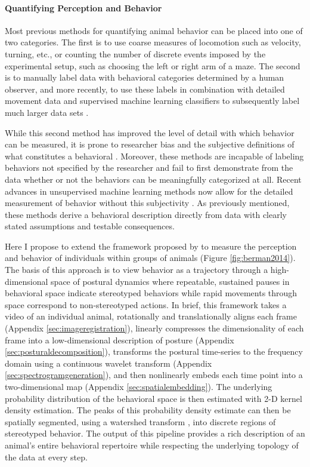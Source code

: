 \documentclass[11pt,a4paper,oneside]{article}
\begin{document}
	\paragraph{Quantifying Perception and Behavior}
	\par
	Most previous methods for quantifying animal behavior can be placed into one of two categories. The first is to use coarse measures of locomotion such as velocity, turning, etc., or counting the number of discrete events imposed by the experimental setup, such as choosing the left or right arm of a maze. The second is to manually label data with behavioral categories determined by a human observer, and more recently, to use these labels in combination with detailed movement data and supervised machine learning classifiers to subsequently label much larger data sets \citep{kain2013leg,kabra2013jaaba}. 
	\par
	While this second method has improved the level of detail with which behavior can be measured, it is prone to researcher bias and the subjective definitions of what constitutes a behavioral . Moreover, these methods are incapable of labeling behaviors not specified by the researcher and fail to first demonstrate from the data whether or not the behaviors can be meaningfully categorized at all. Recent advances in unsupervised machine learning methods now allow for the detailed measurement of behavior without this subjectivity \citep{berman2014drosopholid, berman2014mapping, berman2016predictability, klibaite2017unsupervised, wiltschko2015,todd2017exploration}. As previously mentioned, these methods derive a behavioral description directly from data with clearly stated assumptions and testable consequences.
	\par
	Here I propose to extend the framework proposed by \cite{berman2014mapping,berman2014drosopholid} to measure the perception and behavior of individuals within groups of animals (Figure \ref{fig:berman2014}). The basis of this approach is to view behavior as a trajectory through a high-dimensional space of postural dynamics where repeatable, sustained pauses in behavioral space indicate stereotyped behaviors while rapid movements through space correspond to non-stereotyped actions. In brief, this framework takes a video of an individual animal, rotationally and translationally aligns each frame (Appendix \ref{sec:imageregistration}), linearly compresses the dimensionality of each frame into a low-dimensional description of posture (Appendix \ref{sec:posturaldecomposition}), transforms the postural time-series to the frequency domain using a continuous wavelet transform (Appendix \ref{sec:spectrogramgeneration}), and then nonlinearly embeds each time point into a two-dimensional map (Appendix \ref{sec:spatialembedding}). The underlying probability distribution of the behavioral space is then estimated with 2-D kernel density estimation. The peaks of this probability density estimate can then be spatially segmented, using a watershed transform \citep{roerdink2000watershed}, into discrete regions of stereotyped behavior. The output of this pipeline provides a rich description of an animal's entire behavioral repertoire while respecting the underlying topology of the data at every step.
\end{document}

